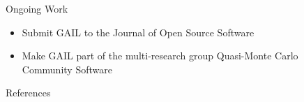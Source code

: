 \documentclass[final]{beamer}
\newlength{\onecolwid}
\newlength{\twocolwid}
\begin{document}
\begin{frame}[t]
\begin{columns}[t]
\begin{column}{\twocolwid}
\begin{columns}[t,totalwidth=\twocolwid]
\begin{column}{\onecolwid}
\end{column} %



\begin{column}{\onecolwid}\vspace{-.8in} %









\begin{alertblock}{Ongoing Work}

\begin{itemize} 
\item Submit GAIL to the Journal of Open Source Software
\item Make GAIL part of the multi-research group Quasi-Monte Carlo Community Software
\end{itemize}

\end{alertblock}


\begin{block}{References}

\nocite{*} %
\small{  %
\vspace{0.8in}}

\end{block}




\end{column}
\end{columns}
\end{column}
\end{columns}
\end{frame}
\end{document}
